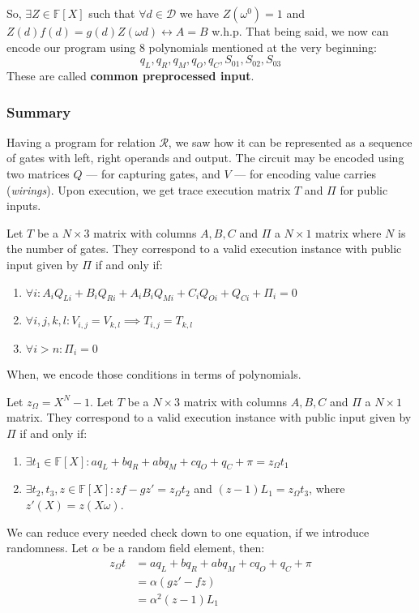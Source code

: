\documentclass[../lecture-notes.tex]{subfiles}
\begin{document}
So, $\exists Z \in \mathbb{F}[X]$ such that $\forall d \in \mathcal{D}$ we have $Z(\omega^{0}) = 1$ and $Z(d)f(d) = g(d)Z(\omega d) \leftrightarrow A = B$ w.h.p. That being said, we now can encode our program using 8 polynomials mentioned at the very beginning:
\[q_L, q_R, q_M, q_O, q_C, S_{01}, S_{02}, S_{03}\]
These are called \textbf{common preprocessed input}.

\subsubsection{Summary}
Having a program for relation $\mathcal{R}$, we saw how it can be represented as
a sequence of gates with left, right operands and output. The circuit may be
encoded using two matrices $Q$ --- for capturing gates, and $V$ --- for encoding
value carries (\textit{wirings}). Upon execution, we get trace execution matrix
$T$ and $\Pi$ for public inputs.

\begin{definition}
Let $T$ be a $N \times 3$ matrix with columns $A, B, C$ and $\Pi$ a $N \times 1$
matrix where $N$ is the number of gates. They correspond to a valid execution
instance with public input given by $\Pi$ if and only if:

\begin{enumerate}
    \item \(\forall i: A_iQ_{Li} + B_iQ_{Ri} + A_iB_iQ_{Mi} + C_iQ_{Oi} + Q_{Ci} + \Pi_i = 0\)
    \item \(\forall i, j, k, l: V_{i,j} = V_{k,l} \implies T_{i,j} = T_{k,l}\)
    \item \(\forall i > n: \Pi_i = 0\)
\end{enumerate}
\end{definition}

When, we encode those conditions in terms of polynomials.

\begin{definition}
Let $z_{\Omega} = X^N - 1$. Let $T$ be a $N \times 3$ matrix with columns $A, B,
C$ and $\Pi$ a $N \times 1$ matrix. They correspond to a valid execution
instance with public input given by $\Pi$ if and only if:

\begin{enumerate}
    \item \(\exists t_1 \in \mathbb{F}[X]: aq_L + bq_R + abq_M + cq_O + q_C + \pi = z_{\Omega}t_1\)
    \item \(\exists t_2, t_3, z \in \mathbb{F}[X]: zf - gz' = z_{\Omega}t_2\) and \((z-1)L_1 = z_{\Omega}t_3\), where $z'(X) = z(X\omega)$.
\end{enumerate}
\end{definition}
\begin{remark}
We can reduce every needed check down to one equation, if we introduce randomness.
Let $\alpha$ be a random field element, then: 
\[
    \begin{aligned}
        z_{\Omega}t &= aq_L + bq_R + abq_M + cq_O + q_C + \pi \\
        &= \alpha(gz' - fz) \\
        &= \alpha^2(z - 1)L_1
    \end{aligned}
\]
\end{remark}
\end{document}
